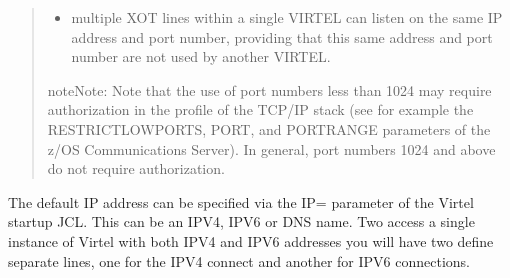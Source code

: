 \documentclass[letterpaper,10pt,english]{sphinxmanual}
\begin{document}
\begin{description}
\begin{quote}
\begin{itemize}
\item {} 
multiple XOT lines within a single VIRTEL can listen on the same IP address and port number, providing that this same address and port number are not used by another VIRTEL.

\end{itemize}

\begin{sphinxadmonition}{note}{Note:}
Note that the use of port numbers less than 1024 may require authorization in the profile of the TCP/IP stack (see for example the RESTRICTLOWPORTS, PORT, and PORTRANGE parameters of the z/OS Communications Server). In general, port numbers 1024 and above do not require authorization.
\end{sphinxadmonition}
\end{quote}

The default IP address can be specified via the IP= parameter of the Virtel startup JCL. This can be an IPV4, IPV6 or DNS name. Two access a single instance of Virtel with both IPV4 and IPV6 addresses you will have two define separate lines, one for the IPV4 connect and another for IPV6 connections.

\begin{sphinxVerbatim}[commandchars=\\\{\}]
     
 
 


     
 
 
\end{sphinxVerbatim}


\end{description}
\end{document}
